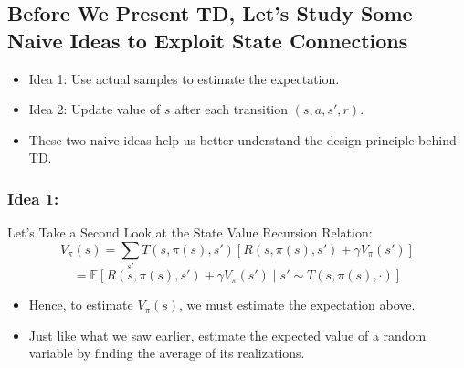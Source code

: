 \subsection{Before We Present TD, Let's Study Some Naive Ideas to Exploit State Connections}
\begin{intuition}
    \begin{itemize}
        \item Idea 1: Use actual samples to estimate the expectation.
        \item Idea 2: Update value of $s$ after each transition $(s, a, s', r)$.
    \end{itemize}
    \begin{itemize}
        \item These two naive ideas help us better understand the design principle behind TD.
    \end{itemize}
\end{intuition}

\subsubsection{Idea 1:}
\begin{definition}
    Let’s Take a Second Look at the State Value Recursion Relation:
    \[
    V_\pi(s) = \sum_{s'} T(s, \pi(s), s') \left[ R(s, \pi(s), s') + \gamma V_\pi(s') \right]
    \]
    \[
    = \mathbb{E} \left[ R(s, \pi(s), s') + \gamma V_\pi(s') \mid s' \sim T(s, \pi(s), \cdot) \right]
    \]
    \begin{itemize}
        \item Hence, to estimate $V_\pi(s)$, we must estimate the expectation above.
        \item Just like what we saw earlier, estimate the expected value of a random variable by finding the average of its realizations.
    \end{itemize}
\end{definition}